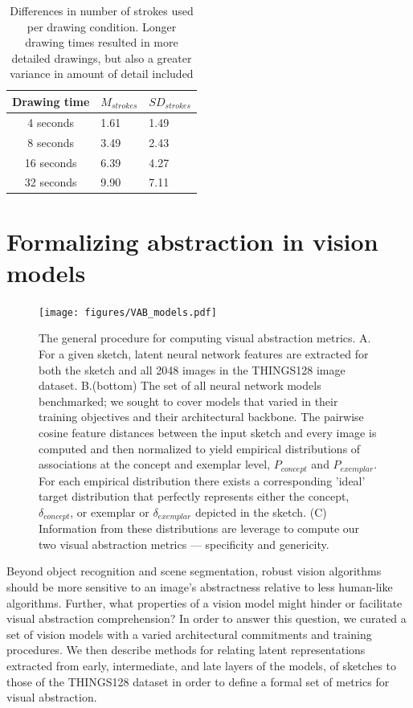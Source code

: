 \documentclass[10pt,letterpaper]{article}
\begin{document}
\begin{table}[h!]
    \centering
    \begin{tabular}{c|l l}
        Drawing time & $M_{strokes}$ & $SD_{strokes}$\\
         \toprule
        4 seconds & 1.61 & 1.49\\
        8 seconds & 3.49 & 2.43\\
        16 seconds & 6.39 & 4.27\\
        32 seconds & 9.90 & 7.11\\
        \bottomrule 
    \end{tabular}
    \caption{Differences in number of strokes used per drawing condition. Longer drawing times resulted in more detailed drawings, but also a greater variance in amount of detail included }
    \label{tab:strokes}
\end{table}


\section{Formalizing abstraction in vision models}
\begin{figure}
    \centering
    \texttt{[image: figures/VAB\_models.pdf]}
 
    \caption{The general procedure for computing visual abstraction metrics. A. For a given sketch, latent neural network features are extracted for both the sketch and all 2048 images in the THINGS128 image dataset. B.(bottom)  The set of all neural network models benchmarked; we sought to cover models that varied in their training objectives and their architectural backbone. The pairwise cosine feature distances between the input sketch and every image is computed and then normalized to yield empirical distributions of associations at the concept and exemplar level, $P_{concept}$ and $P_{exemplar}$. For each empirical distribution there exists a corresponding 'ideal' target distribution that perfectly represents either the concept, $\delta_{concept}$, or exemplar or $\delta_{exemplar}$ depicted in the sketch. (C) Information from these distributions are leverage to compute our two visual abstraction metrics — specificity and genericity.}

    \label{fig:trial}
\end{figure}

Beyond object recognition and scene segmentation, robust vision algorithms should be more sensitive to an image's abstractness relative to less human-like algorithms. Further, what properties of a vision model might hinder or facilitate visual abstraction comprehension? In order to answer this question, we curated a set of vision models with a varied architectural commitments and training procedures. We then describe methods for relating latent representations extracted from early, intermediate, and late layers of the models, of sketches to those of the THINGS128 dataset in order to define a formal set of metrics for visual abstraction.
\end{document}
